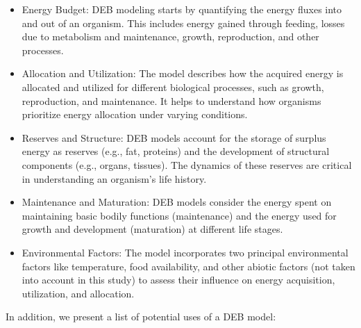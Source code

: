 \begin{itemize}
  \item Energy Budget: DEB modeling starts by quantifying the energy fluxes into and out of an organism. This includes energy gained through feeding, losses due to metabolism and maintenance, growth, reproduction, and other processes.\\
  
  \item Allocation and Utilization: The model describes how the acquired energy is allocated and utilized for different biological processes, such as growth, reproduction, and maintenance. It helps to understand how organisms prioritize energy allocation under varying conditions.\\

  \item Reserves and Structure: DEB models account for the storage of surplus energy as reserves (e.g., fat, proteins) and the development of structural components (e.g., organs, tissues). The dynamics of these reserves are critical in understanding an organism's life history.\\

  \item Maintenance and Maturation: DEB models consider the energy spent on maintaining basic bodily functions (maintenance) and the energy used for growth and development (maturation) at different life stages.\\

  \item Environmental Factors: The model incorporates two principal environmental factors like temperature, food availability, and other abiotic factors (not taken into account in this study) to assess their influence on energy acquisition, utilization, and allocation.\\

\end{itemize}

In addition, we present a list of potential uses of a DEB model:

